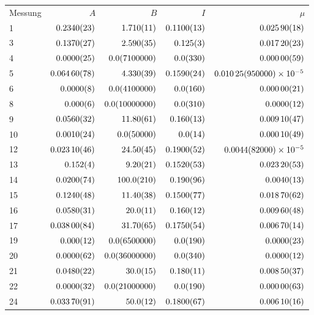 \begin{tabular}{l|r|r|r|r}
Messung & $A$ & $B$ & $I$ & $\mu$ \\
1 & $\num{0.234+-0.0023}$ & $\num{1.71+-0.011}$ & $\num{0.11+-0.0013}$ & $\num{0.0259+-0.00018}$ \\
3 & $\num{0.137+-0.0027}$ & $\num{2.59+-0.035}$ & $\num{0.125+-0.003}$ & $\num{0.0172+-0.00023}$ \\
4 & $\num{0.0+-0.0025}$ & $\num{0+-710000.0}$ & $\num{0+-33.0}$ & $\num{0.0+-0.00059}$ \\
5 & $\num{0.0646+-0.00078}$ & $\num{4.33+-0.039}$ & $\num{0.159+-0.0024}$ & $\num{0.01025+-9.5e-05}$ \\
6 & $\num{0.0+-0.0008}$ & $\num{0+-410000.0}$ & $\num{0+-16.0}$ & $\num{0.0+-0.00021}$ \\
8 & $\num{0.0+-0.006}$ & $\num{0+-1000000.0}$ & $\num{0+-31.0}$ & $\num{0.0+-0.0012}$ \\
9 & $\num{0.056+-0.0032}$ & $\num{11.8+-0.61}$ & $\num{0.16+-0.013}$ & $\num{0.0091+-0.00047}$ \\
10 & $\num{0.001+-0.0024}$ & $\num{0+-5000.0}$ & $\num{0+-1.4}$ & $\num{0.0001+-0.00049}$ \\
12 & $\num{0.0231+-0.00046}$ & $\num{24.5+-0.45}$ & $\num{0.19+-0.0052}$ & $\num{0.0044+-8.2e-05}$ \\
13 & $\num{0.152+-0.004}$ & $\num{9.2+-0.21}$ & $\num{0.152+-0.0053}$ & $\num{0.0232+-0.00053}$ \\
14 & $\num{0.02+-0.0074}$ & $\num{100+-21.0}$ & $\num{0.19+-0.096}$ & $\num{0.004+-0.0013}$ \\
15 & $\num{0.124+-0.0048}$ & $\num{11.4+-0.38}$ & $\num{0.15+-0.0077}$ & $\num{0.0187+-0.00062}$ \\
16 & $\num{0.058+-0.0031}$ & $\num{20+-1.1}$ & $\num{0.16+-0.012}$ & $\num{0.0096+-0.00048}$ \\
17 & $\num{0.038+-0.00084}$ & $\num{31.7+-0.65}$ & $\num{0.175+-0.0054}$ & $\num{0.0067+-0.00014}$ \\
19 & $\num{0.0+-0.012}$ & $\num{0+-650000.0}$ & $\num{0+-19.0}$ & $\num{0.0+-0.0023}$ \\
20 & $\num{0.0+-0.0062}$ & $\num{0+-3600000.0}$ & $\num{0+-34.0}$ & $\num{0.0+-0.0012}$ \\
21 & $\num{0.048+-0.0022}$ & $\num{30+-1.5}$ & $\num{0.18+-0.011}$ & $\num{0.0085+-0.00037}$ \\
22 & $\num{0.0+-0.0032}$ & $\num{0+-2100000.0}$ & $\num{0+-19.0}$ & $\num{0.0+-0.00063}$ \\
24 & $\num{0.0337+-0.00091}$ & $\num{50+-1.2}$ & $\num{0.18+-0.0067}$ & $\num{0.0061+-0.00016}$ \\

\end{tabular}
